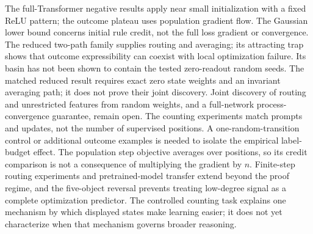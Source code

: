 The full-Transformer negative results apply near small initialization with a fixed
ReLU pattern; the outcome plateau uses population gradient flow.
The Gaussian lower bound concerns initial rule credit, not the full loss gradient
or convergence. The reduced two-path family supplies routing and averaging;
its attracting trap shows that outcome expressibility can coexist with local
optimization failure. Its basin has not been shown to contain the tested
zero-readout random seeds. The matched reduced result requires exact zero state
weights and an invariant averaging path; it does not prove their joint discovery. Joint discovery of routing and unrestricted features from
random weights, and a full-network process-convergence guarantee, remain open.
The counting experiments match prompts and updates, not the number of supervised
positions. A one-random-transition control or additional outcome examples is needed
to isolate the empirical label-budget effect. The population step objective averages
over positions, so its credit comparison is not a consequence of multiplying the gradient by $n$.
Finite-step routing experiments and pretrained-model transfer extend beyond the proof regime,
and the five-object reversal prevents treating low-degree signal as a complete optimization
predictor. The controlled counting task explains one mechanism by which displayed states
make learning easier; it does not yet characterize when that mechanism governs broader reasoning.
